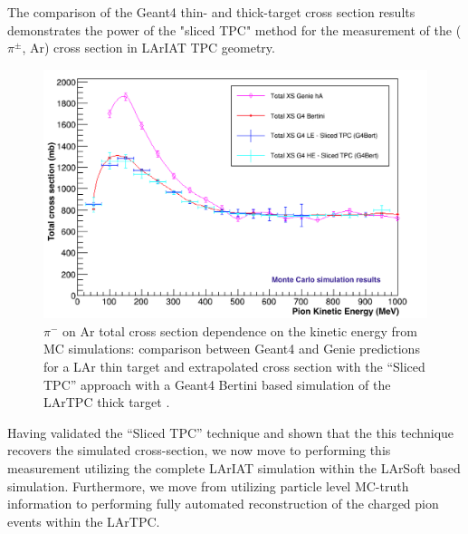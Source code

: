 The comparison of the Geant4 thin- and thick-target cross section results demonstrates the power of the "sliced TPC" method for the measurement of the ($\pi^{\pm}$, Ar) cross section in LArIAT TPC geometry. 

\begin{figure}[h!]
\centering
\includegraphics[scale=0.45]{./images/compare_new.png}
\caption{$\pi^-$ on Ar total cross section dependence on the kinetic energy from MC simulations: comparison between Geant4 and Genie predictions for a LAr thin target and extrapolated cross section with the ``Sliced TPC'' approach with a Geant4 Bertini based simulation of the LArTPC thick target \cite{myThesis}.}
\label{fig:xsplot}
\end{figure}

Having validated the ``Sliced TPC'' technique and shown that the this technique recovers the simulated cross-section, we now move to performing this measurement utilizing the complete LArIAT simulation within the LArSoft \cite{} based simulation.  Furthermore, we move from utilizing particle level MC-truth information to performing fully automated reconstruction of the charged pion events within the LArTPC. 



